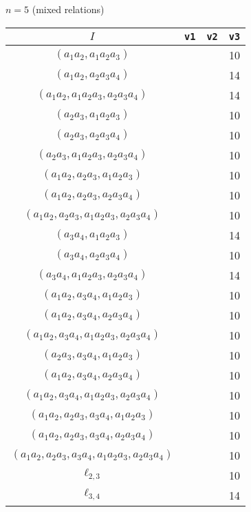 \documentclass{article}
\begin{document}
\begin{flushleft}
\begin{center}
      $n=5$ (mixed relations)
      \begin{longtable}{|c|c|c|c|}
         \hline
         $I$ & \texttt{v1} & \texttt{v2} & \texttt{v3} \\
         \hline
         $(a_1a_2,a_1a_2a_3)$ &&& 10 \\
         $(a_1a_2,a_2a_3a_4)$ &&& 14 \\
         $(a_1a_2,a_1a_2a_3,a_2a_3a_4)$ &&& 14 \\
         $(a_2a_3,a_1a_2a_3)$ &&& 10 \\
         $(a_2a_3,a_2a_3a_4)$ &&& 10 \\
         $(a_2a_3,a_1a_2a_3,a_2a_3a_4)$ &&& 10 \\
         $(a_1a_2,a_2a_3,a_1a_2a_3)$ &&& 10 \\
         $(a_1a_2,a_2a_3,a_2a_3a_4)$ &&& 10 \\
         $(a_1a_2,a_2a_3,a_1a_2a_3,a_2a_3a_4)$ &&& 10 \\
         $(a_3a_4,a_1a_2a_3)$ &&& 14 \\
         $(a_3a_4,a_2a_3a_4)$ &&& 10 \\
         $(a_3a_4,a_1a_2a_3,a_2a_3a_4)$ &&& 14 \\
         $(a_1a_2,a_3a_4,a_1a_2a_3)$ &&& 10 \\
         $(a_1a_2,a_3a_4,a_2a_3a_4)$ &&& 10 \\
         $(a_1a_2,a_3a_4,a_1a_2a_3,a_2a_3a_4)$ &&& 10 \\
         $(a_2a_3,a_3a_4,a_1a_2a_3)$ &&& 10 \\
         $(a_1a_2,a_3a_4,a_2a_3a_4)$ &&& 10 \\
         $(a_1a_2,a_3a_4,a_1a_2a_3,a_2a_3a_4)$ &&& 10 \\
         $(a_1a_2,a_2a_3,a_3a_4,a_1a_2a_3)$ &&& 10 \\
         $(a_1a_2,a_2a_3,a_3a_4,a_2a_3a_4)$ &&& 10 \\
         $(a_1a_2,a_2a_3,a_3a_4,a_1a_2a_3,a_2a_3a_4)$ &&& 10 \\
         \hline
         $\ell_{2,3}$ &&& 10 \\
         \hline
         $\ell_{3,4}$ &&& 14 \\
         \hline
      \end{longtable}


\end{center}
\end{flushleft}
\end{document}
